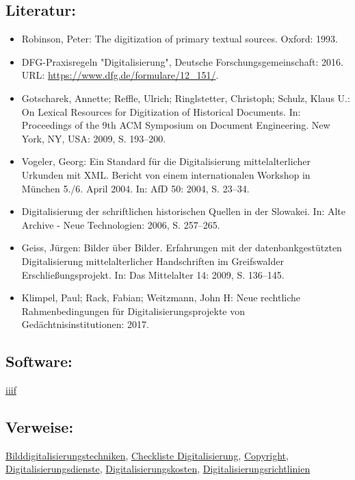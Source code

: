 \documentclass{article}
\begin{document}
        \subsection*{Literatur:}\begin{itemize}\item Robinson, Peter: The digitization of primary textual sources. Oxford: 1993.\item DFG-Praxisregeln "Digitalisierung", Deutsche Forschungsgemeinschaft: 2016. URL: \url{https://www.dfg.de/formulare/12_151/}.\item Gotscharek, Annette; Reffle, Ulrich; Ringlstetter, Christoph; Schulz, Klaus U.: On Lexical Resources for Digitization of Historical
                              Documents. In: Proceedings of the 9th ACM Symposium on Document
                              Engineering. New York, NY, USA: 2009, S. 193–200.\item Vogeler, Georg: Ein Standard für die Digitalisierung mittelalterlicher
                              Urkunden mit XML. Bericht von einem internationalen Workshop in
                              München 5./6. April 2004. In: AfD 50: 2004, S. 23–34.\item Digitalisierung der schriftlichen historischen Quellen
                              in der Slowakei. In: Alte Archive - Neue Technologien: 2006, S. 257–265.\item Geiss, Jürgen: Bilder über Bilder. Erfahrungen mit der
                              datenbankgestützten Digitalisierung mittelalterlicher Handschriften im
                              Greifswalder Erschließungsprojekt. In: Das Mittelalter 14: 2009, S. 136–145.\item Klimpel, Paul; Rack, Fabian; Weitzmann, John H: Neue rechtliche Rahmenbedingungen für
                              Digitalisierungsprojekte von Gedächtnisinstitutionen: 2017.\end{itemize}\subsection*{Software:}\href{https://iiif.io/}{iiif}\subsection*{Verweise:}\href{https://gams.uni-graz.at/o:konde.37}{Bilddigitalisierungstechniken}, \href{https://gams.uni-graz.at/o:konde.40}{Checkliste Digitalisierung}, \href{https://gams.uni-graz.at/o:konde.44}{Copyright}, \href{https://gams.uni-graz.at/o:konde.61}{Digitalisierungsdienste}, \href{https://gams.uni-graz.at/o:konde.62}{Digitalisierungskosten}, \href{https://gams.uni-graz.at/o:konde.63}{Digitalisierungsrichtlinien
}
\end{document}
